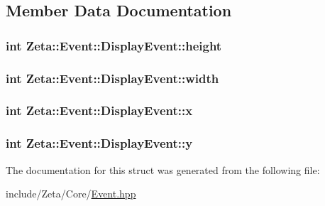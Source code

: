 \subsection{Member Data Documentation}
\hypertarget{structZeta_1_1Event_1_1DisplayEvent_a7dee6ab4b0ad930516054fa39c42f3f9}{
\subsubsection[{height}]{\setlength{\rightskip}{0pt plus 5cm}int Zeta\+::\+Event\+::\+Display\+Event\+::height}}\label{structZeta_1_1Event_1_1DisplayEvent_a7dee6ab4b0ad930516054fa39c42f3f9}
\hypertarget{structZeta_1_1Event_1_1DisplayEvent_a8387ebc2911a483428dd1b3f6c78ae7a}{
\subsubsection[{width}]{\setlength{\rightskip}{0pt plus 5cm}int Zeta\+::\+Event\+::\+Display\+Event\+::width}}\label{structZeta_1_1Event_1_1DisplayEvent_a8387ebc2911a483428dd1b3f6c78ae7a}
\hypertarget{structZeta_1_1Event_1_1DisplayEvent_ad7063ad46350261a2d99a40e53713dea}{
\subsubsection[{x}]{\setlength{\rightskip}{0pt plus 5cm}int Zeta\+::\+Event\+::\+Display\+Event\+::x}}\label{structZeta_1_1Event_1_1DisplayEvent_ad7063ad46350261a2d99a40e53713dea}
\hypertarget{structZeta_1_1Event_1_1DisplayEvent_a7554c6694a9aa0e32e40dca0be20f84b}{
\subsubsection[{y}]{\setlength{\rightskip}{0pt plus 5cm}int Zeta\+::\+Event\+::\+Display\+Event\+::y}}\label{structZeta_1_1Event_1_1DisplayEvent_a7554c6694a9aa0e32e40dca0be20f84b}


The documentation for this struct was generated from the following file\+:\begin{DoxyCompactItemize}
\item 
include/\+Zeta/\+Core/\hyperlink{Event_8hpp}{Event.\+hpp}\end{DoxyCompactItemize}
